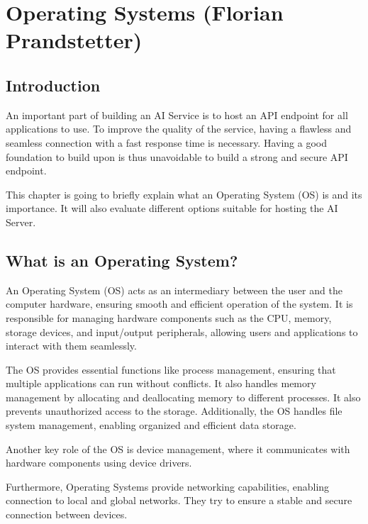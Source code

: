 \chapter{Operating Systems (Florian Prandstetter)}
\label{chap:Operating_Systems_used}


\section {Introduction}

An important part of building an AI Service is to host an API endpoint for all applications to use. To improve the quality of the service, having a flawless and seamless connection with a fast response time is necessary.
Having a good foundation to build upon is thus unavoidable to build a strong and secure API endpoint. 

This chapter is going to briefly explain what an Operating System (OS) is and its importance.
It will also evaluate different options suitable for hosting the AI Server.

\section{What is an Operating System?}

An Operating System (OS) acts as an intermediary between the user and the computer hardware, ensuring smooth and efficient operation of the system. It is responsible for managing hardware components such as the CPU, memory, storage devices, and input/output peripherals, allowing users and applications to interact with them seamlessly.

The OS provides essential functions like process management, ensuring that multiple applications can run without conflicts. It also handles memory management by allocating and deallocating memory to different processes. It also prevents unauthorized access to the storage.
Additionally, the OS handles file system management, enabling organized and efficient data storage. 

Another key role of the OS is device management, where it communicates with hardware components using device drivers.

Furthermore, Operating Systems provide networking capabilities, enabling connection to local and global networks. They try to ensure a stable and secure connection between devices.

